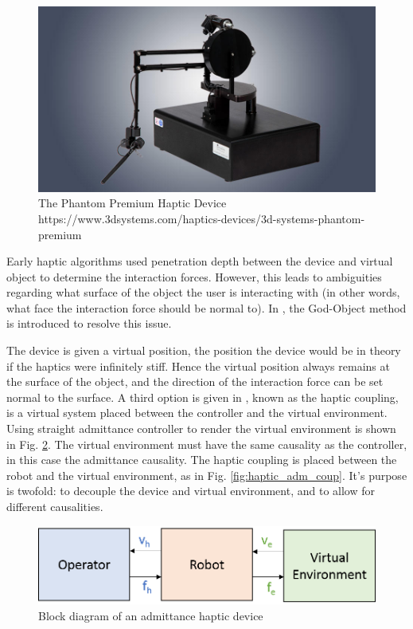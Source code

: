 \documentclass[12pt]{report}
\begin{document}
	
	\begin{figure}[t] 
		\centering
		\includegraphics[width=0.6\linewidth]{phantom}
		\caption{The Phantom Premium Haptic Device https://www.3dsystems.com/haptics-devices/3d-systems-phantom-premium}
		\label{fig:phantom}
	\end{figure}		
	
	
		
	
		Early haptic algorithms used penetration depth between the device and virtual object to determine the interaction forces. However, this leads to ambiguities regarding what surface of the object the user is interacting with (in other words, what face the interaction force should be normal to). In \cite{Zilles}, the God-Object method is introduced to resolve this issue. 
		
		The device is given a virtual position, the position the device would be in theory if the haptics were infinitely stiff. Hence the virtual position always remains at the surface of the object, and the direction of the interaction force can be set normal to the surface. A third option is given in \cite{Adams1999}, known as the haptic coupling, is a virtual system placed between the controller and the virtual environment. Using straight admittance controller to render the virtual environment is shown in Fig. \ref{fig:haptic_adm}. The virtual environment must have the same causality as the controller, in this case the admittance causality. The haptic coupling is placed between the robot and the virtual environment, as in Fig. \ref{fig:haptic_adm_coup}. It's purpose is twofold: to decouple the device and virtual environment, and to allow for different causalities.
	
	\begin{figure}[h] 
		\centering
		\includegraphics[width=0.75\linewidth]{haptics_admittance}
		\caption{Block diagram of an admittance haptic device}
		\label{fig:haptic_adm}
	\end{figure}	
	
\end{document}
